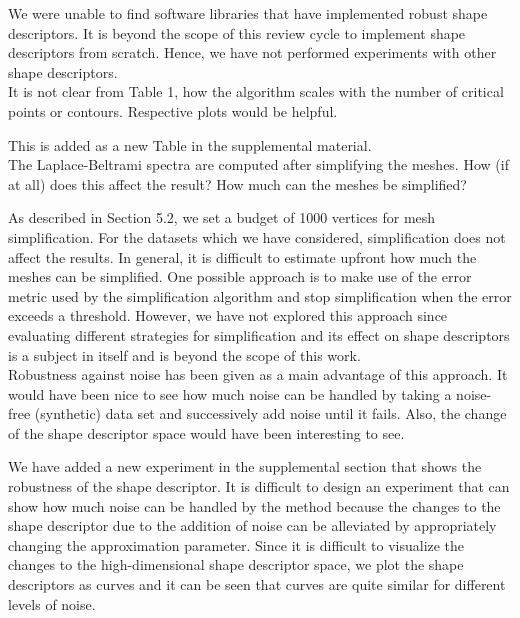 \documentclass[10pt]{article}
\begin{document}
   {\color{blue} We were unable to find software libraries that have implemented
	robust shape descriptors. It is beyond the scope of this review cycle
	to implement shape descriptors from scratch. Hence, we have not
performed experiments with other shape descriptors.}\\

   It is not clear from Table 1, how the algorithm scales with the number
   of critical points or contours. Respective plots would be helpful.

   {\color{blue}This is added as a new Table in the supplemental material.}\\

   The Laplace-Beltrami spectra are computed after simplifying the meshes.
   How (if at all) does this affect the result? How much can the meshes be
   simplified?

   {\color{blue}As described in Section 5.2, we set a budget of 1000 vertices
	   for mesh simplification. For the datasets which we have considered,
	   simplification does not affect the results. In general, it is difficult
	   to estimate upfront how much the meshes can be simplified. One possible approach
	   is to make use of the error metric used by the simplification algorithm
	   and stop simplification when the error exceeds a threshold. However, we have
	   not explored this approach since evaluating different strategies for simplification
	   and its effect on shape descriptors is a subject in itself and is beyond the scope
   of this work.}\\

   Robustness against noise has been given as a main advantage of this
   approach. It would have been nice to see how much noise can be handled by
   taking a noise-free (synthetic) data set and successively add noise until
   it fails. Also, the change of the shape descriptor space would have been
   interesting to see.

   {\color{blue}We have added a new experiment in the supplemental section
	   that shows the robustness of the shape descriptor. It is difficult
	   to design an experiment that can show how much noise can be handled by the
	   method because the changes to the shape descriptor due to the addition of
	   noise can be alleviated by appropriately changing the approximation parameter.
	   Since it is difficult to visualize the changes
	   to the high-dimensional shape descriptor space, we plot the shape descriptors
   as curves and it can be seen that curves are quite similar for different levels of noise.}\\
\end{document}
